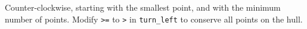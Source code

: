 Counter-clockwise, starting with the smallest point, and with the minimum number of points. Modify \texttt{>=} to \texttt{>} in \texttt{turn\_left} to conserve all points on the hull.


